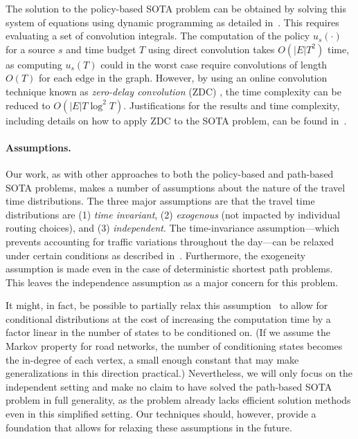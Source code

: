 \documentclass[oribibl]{llncs}
\begin{document}
		The solution to the policy-based SOTA problem can be obtained by solving this system of equations
		using dynamic programming as detailed in~\cite{samaranayake2012tractable}.
		This requires evaluating a set of convolution integrals. The computation of
		the policy $u_s(\cdot)$ for a source $s$ and time budget $T$ using direct convolution takes $O(|E| T^2)$ time,
		as computing $u_s(T)$ could in the worst case require convolutions of length $O(T)$ for each edge in the graph.
		However, by using an online convolution technique
		known as \textit{zero-delay convolution} (ZDC) \cite{gardner1994efficient, dean2010speeding},
		the time complexity can be reduced to $O(|E| T \log^2 T)$.
		Justifications for the results and time complexity, including details
		on how to apply ZDC to the SOTA problem, can be found in~\cite{samaranayake2012tractable, samaranayake2012speedup}.

		\paragraph{Assumptions.}
		Our work, as with other approaches to both the policy-based and path-based SOTA problems,
		makes a number of assumptions about the nature of the travel time distributions.
		The three major assumptions are that the travel time distributions are
		(1) \textit{time invariant},
		(2) \textit{exogenous} (not impacted by individual routing choices), and
		(3) \textit{independent}.
		The time-invariance assumption---which prevents accounting for traffic variations throughout the
		day---can be relaxed under certain conditions as described in~\cite{samaranayake2012tractable}.
		Furthermore, the exogeneity assumption is made even in the case of deterministic shortest path problems.
		This leaves the independence assumption as a major concern for this problem.

		It might, in fact, be possible to partially relax this assumption~\citep{samaranayake2012tractable}
		to allow for conditional distributions at the cost of
		increasing the computation time by a factor linear in the number of states to be conditioned on.
		(If we assume the Markov property for road networks,
		the number of conditioning states becomes the in-degree of each vertex,
		a small enough constant that may make generalizations in this direction practical.)
		Nevertheless, we will only focus on the independent setting and make no claim to have
		solved the path-based SOTA problem in full generality,
		as the problem already lacks efficient solution methods even in this simplified setting.
		Our techniques should, however, provide a foundation that allows for
		relaxing these assumptions in the future.
\end{document}
